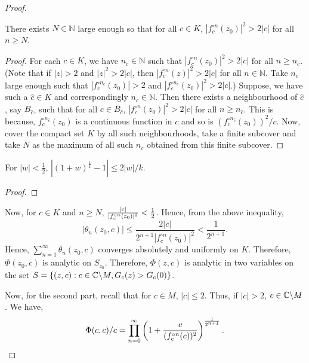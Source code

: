 \begin{proof}
\begin{claim}
	There exists \( N\in \mathbb{N} \) large enough so that 
	for all \( c\in K \), \( |f_c^{\circ n}(z_0)|^2>2|c| \)
	for all \( n\ge  N \). 
\end{claim}
\begin{proof}
For each \( c\in K \), we have \( n_c \in \mathbb{N} \) such that \( |f_c^{\circ n}(z_0)|^2>2|c| \) for all \( n\ge n_c \).
(Note that if \( |z|>2 \) and \(|z|^2>2|c|  \), then \( |f_c^{\circ n}(z)|^2 > 2|c| \) for all \( n\in \mathbb{N} \). Take \( n_c \)
large enough such that \( | f_c^{\circ n_c}(z_0)| > 2 \) and \( |f_c^{\circ n_c}(z_0)|^2 > 2|c| \).)
Suppose, we have such a \( \hat{c}\in K  \) and correspondingly \( n_{\hat{c}}\in \mathbb{N} \). Then there exists
a neighbourhood of \( \hat{c} \), say \( B_{\hat{c}} \),
such that for all \( c\in B_{\hat{c}}\), \( |f_c^{\circ n}(z_0)|^2>2|c| \) for all \( n\ge n_{\hat{c}} \). This is because, \( f_c^{\circ n_{\hat{c}}}(z_0) \)
is a continuous function in \( c \) and so is \( (f_c^{\circ n_{\hat{c}}}(z_0))^2 /c \). Now, cover the compact set \( K \) by 
all such neighbourhoods, take a finite subcover and take \( N \) as the maximum
of all such \( n_c \) obtained from this finite subcover.
\end{proof}

\begin{claim}
	For \( |w|<\frac{1}{2} \), \( |(1+w)^{\frac{1}{k}} -1|\le 2|w|/k \).
\end{claim}
\begin{proof}
\end{proof}

Now, for \( c\in K \) and \( n\ge N \), \( \frac{|c|}{|\fcof[n](z_0)|^2}<\frac{1}{2} \). Hence, from the above inequality, \[
	|\theta _n(z_0,c)|\le \frac{2|c|}{2^{n+1}|f_c^{\circ n}(z_0)|^2}<\frac{1}{2^{n+1}}
.\] 
Hence, \( \sum_{n=1}^{\infty}\theta _n(z_0,c)  \) converges absolutely and uniformly on \( K \). Therefore, \( \Phi(z_0,c) \)
is analytic on \( S_{z_0} \).
Therefore, \( \Phi(z,c) \) is analytic in two variables on the set \( S=\{(z,c):c\in \mathbb{C}\backslash M, G_c(z)>G_c(0)\} \).

Now, for the second part, recall that for \( c\in M \), \( |c|\le 2 \). Thus,
if \( |c|>2 \), \( c\in \mathbb{C}\backslash M \).
We have, \[
	\Phi(c,c)/c=\prod_{n=0}^\infty \left( 1+ \frac{c}{(\fcof[n](c))^2} \right)^{\frac{1}{2^{n+1}}}
.\] 
\end{proof}

